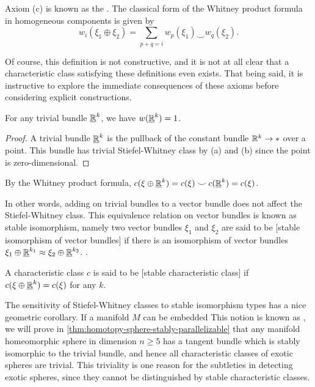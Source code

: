 \begin{remark}
	Axiom (c) is known as the . The classical form of the Whitney product formula in homogeneous components is given by
	\[
		w_i(\xi_1\oplus \xi_2) = \sum_{p+q=i} w_p(\xi_1)\smile w_q(\xi_2).
	\]
\end{remark}

Of course, this definition is not constructive, and it is not at all clear that a characteristic class satisfying these definitions even exists. That being said, it is instructive to explore the immediate consequences of these axioms before considering explicit constructions.

\begin{corollary}
	For any trivial bundle $\underline{\mathbb{R}}^k$, we have $w(\underline{\mathbb{R}}^k)=1$.
\end{corollary}
\begin{proof}
	A trivial bundle $\underline{\mathbb{R}}^k$ is the pullback of the constant bundle $\mathbb{R}^k\to *$ over a point. This bundle has trivial Stiefel-Whitney class by (a) and (b) since the point is zero-dimensional.
\end{proof}

\begin{corollary}
	By the Whitney product formula, $c(\xi\oplus \underline{\mathbb{R}}^k)=c(\xi)\smile c(\underline{\mathbb{R}}^k)= c(\xi)$.
\end{corollary}

In other words, adding on trivial bundles to a vector bundle does not affect the Stiefel-Whitney class. This equivalence relation on vector bundles is known as stable isomorphism, namely two vector bundles $\xi_1$ and $\xi_2$ are said to be [stable isomorphism of vector bundles] if there is an isomorphism of vector bundles $\xi_1\oplus \underline{\mathbb{R}}^{k_1} \approx \xi_2\oplus \underline{\mathbb{R}}^{k_2}$. .

\begin{definition}
	A characteristic class $c$ is said to be [stable characteristic class] if $c(\xi\oplus \underline{\mathbb{R}}^k) = c(\xi)$ for any $k$.
\end{definition}

The sensitivity of Stiefel-Whitney classes to stable isomorphism types has a nice geometric corollary. If a manifold $M$ can be embedded 
This notion is known as ,
we will prove in \cref{thm:homotopy-sphere-stably-parallelizable} that any manifold homeomorphic sphere in dimension $n\geq 5$ has a tangent bundle which is stably isomorphic to the trivial bundle, and hence all characteristic classes of exotic spheres are trivial. This triviality is one reason for the subtleties in detecting exotic spheres, since they cannot be distinguished by stable characteristic classes.

